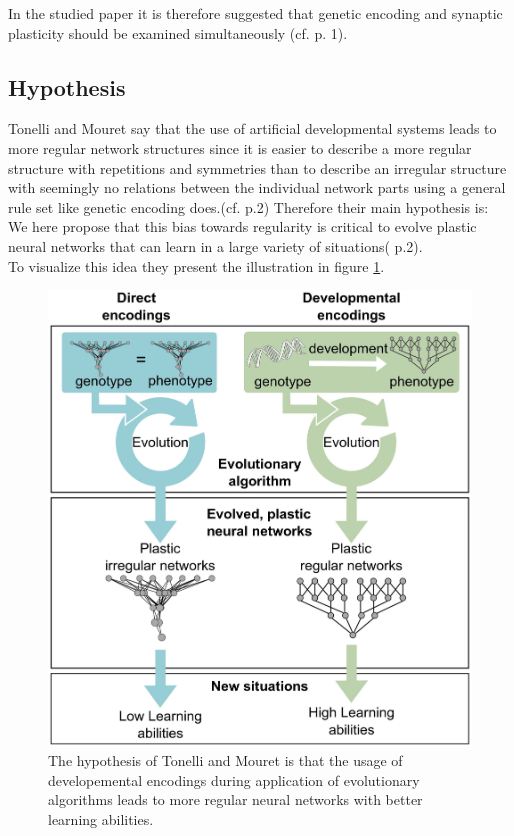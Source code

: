 \documentclass[12pt,twoside]{article}
\theoremstyle{plain}
\theoremstyle{definition}
\theoremstyle{remark}
\begin{document}
In the studied paper \cite{citeulike:12788284} it is therefore suggested that genetic encoding and synaptic plasticity should be examined simultaneously (cf. \cite{citeulike:12788284} p. 1).\\

\subsection{Hypothesis}
Tonelli and Mouret say that the use of artificial developmental systems leads to more regular network structures since it is easier to describe a more regular structure with repetitions and symmetries than to describe an irregular structure with seemingly no relations between the individual network parts using a general rule set like genetic encoding does.(cf. \cite{citeulike:12788284} p.2)
Therefore their main hypothesis is:
\glqq We here propose that this bias towards regularity is critical to evolve plastic neural networks that can learn in a large variety of situations\grqq{}(\cite{citeulike:12788284} p.2).\\
To visualize this idea they present the illustration in figure \ref{fig:hypothesis}.

\begin{figure}[h!]
	\begin{center}		
		\includegraphics[totalheight=0.4\textheight]{direct_vs_developemental.png}
		\caption[The hypothesis of Tonelli and Mouret is that the usage of developemental encodings during application of evolutionary algorithms leads to more regular neural networks with better learning abilities.]{The hypothesis of Tonelli and Mouret is that the usage of developemental encodings during application of evolutionary algorithms leads to more regular neural networks with better learning abilities. \footnotemark} %
		\label{fig:hypothesis}
	\end{center}
\end{figure}
\end{document}
